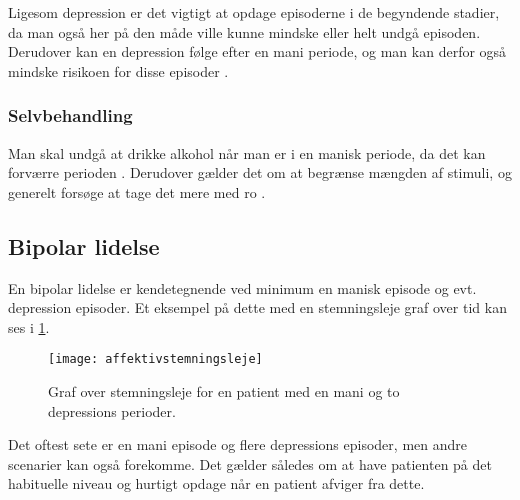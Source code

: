 Ligesom depression er det vigtigt at opdage episoderne i de begyndende stadier, da man også her på den måde ville kunne mindske eller helt undgå episoden.
Derudover kan en depression følge efter en mani periode, og man kan derfor også mindske risikoen for disse episoder \citep{misc:bipolarsundhed}.

\subsubsection{Selvbehandling}
Man skal undgå at drikke alkohol når man er i en manisk periode, da det kan forværre perioden \citep{misc:netpsykmani}.
Derudover gælder det om at begrænse mængden af stimuli, og generelt forsøge at tage det mere med ro \citep{misc:janne-rasmussen}.

\subsection{Bipolar lidelse}
En bipolar lidelse er kendetegnende ved minimum en manisk episode og evt. depression episoder.
Et eksempel på dette med en stemningsleje graf over tid kan ses i \cref{fig:stemningslejegrafeksempel}.

\begin{figure}
	\centering
	\texttt{[image: affektivstemningsleje]}
	\caption{Graf over stemningsleje for en patient med en mani og to depressions perioder.}\label{fig:stemningslejegrafeksempel}
\end{figure}

Det oftest sete er en mani episode og flere depressions episoder, men andre scenarier kan også forekomme.
Det gælder således om at have patienten på det habituelle niveau og hurtigt opdage når en patient afviger fra dette.